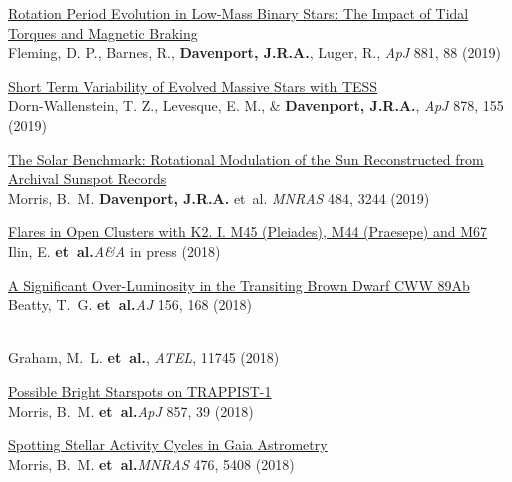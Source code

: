 \documentclass{article}
\begin{document}
\begin{llist}
\begin{etaremune}[leftmargin=10pt]
\item{\sc\href{https://arxiv.org/abs/1903.05686}{\color{blue}Rotation Period Evolution in Low-Mass Binary Stars: The Impact of Tidal Torques and Magnetic Braking}}\\
Fleming, D. P., Barnes, R., {\bf Davenport, J.R.A.}, Luger, R., {\em ApJ} 881, 88 (2019)


\item{\sc\href{https://arxiv.org/abs/1901.09930}{\color{blue}Short Term Variability of Evolved Massive Stars with TESS}}\\
Dorn-Wallenstein, T. Z., Levesque, E. M., \& {\bf Davenport, J.R.A.}, {\em ApJ} 878, 155 (2019)

\item{\sc\href{https://arxiv.org/abs/1901.04557}{\color{blue}The Solar Benchmark: Rotational Modulation of the Sun Reconstructed from Archival Sunspot Records}}\\
Morris, B.~M. {\bf Davenport, J.R.A.} et~al. {\em MNRAS} 484, 3244 (2019)



\item{\sc\href{https://arxiv.org/abs/1812.06725}{\color{blue}Flares in Open Clusters with K2. I. M45 (Pleiades), M44 (Praesepe) and M67}}\\
Ilin, E. {\bf et~al.}{\em A\&A} in press (2018)

\item{\sc\href{https://arxiv.org/abs/1807.11500}{\color{blue}A Significant Over-Luminosity in the Transiting Brown Dwarf CWW 89Ab}}\\
Beatty, T.~G. {\bf et~al.}{\em AJ} 156, 168 (2018)

\item{\href{http://www.astronomerstelegram.org/?read=11745}{\color{blue}{\sc ZTF Bright Transient Survey classifications}}}\\
Graham, M.~L. {\bf et~al.}, {\em ATEL}, 11745 (2018)


\item{\sc \href{https://arxiv.org/abs/1803.04543}{\color{blue}Possible Bright Starspots on TRAPPIST-1}}\\
Morris, B.~M. {\bf et~al.}{\em ApJ} 857, 39 (2018)


\item{\sc \href{https://arxiv.org/abs/1802.09943}{\color{blue}Spotting Stellar Activity Cycles in Gaia Astrometry}}\\
Morris, B.~M. {\bf et~al.}{\em MNRAS} 476, 5408 (2018)



\end{etaremune}
\end{llist}
\end{document}

